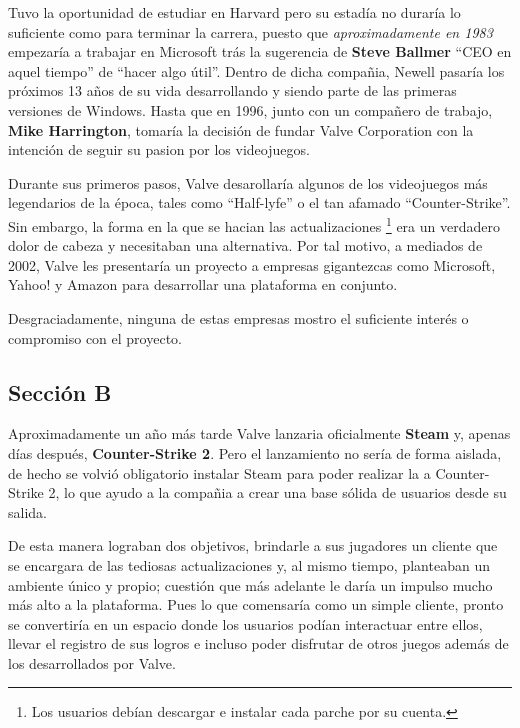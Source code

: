 \documentclass[letterpaper, 11pt]{article}
\begin{document}
    Tuvo la oportunidad de estudiar en Harvard pero su estadía no duraría lo suficiente como para terminar la carrera, puesto que \textit{aproximadamente en 1983} empezaría a trabajar en Microsoft trás la sugerencia de \textbf{Steve Ballmer} \enquote{CEO en aquel tiempo} de \enquote{hacer algo útil}. Dentro de dicha compañia, Newell pasaría los próximos 13 años de su vida desarrollando y siendo parte de las primeras versiones de Windows. Hasta que en 1996, junto con un compañero de trabajo, \textbf{Mike Harrington}, tomaría la decisión de fundar Valve Corporation con la intención de seguir su pasion por los videojuegos. 

\vspace{0.5cm}

    Durante sus primeros pasos, Valve desarollaría algunos de los videojuegos más legendarios de la época, tales como \enquote{Half-lyfe} o el tan afamado \enquote{Counter-Strike}. Sin embargo, la forma en la que se hacian las actualizaciones \footnote{Los usuarios debían descargar e instalar cada parche por su cuenta.} era un verdadero dolor de cabeza y necesitaban una alternativa. Por tal motivo, a mediados de 2002, Valve les presentaría un proyecto a empresas gigantezcas como Microsoft, Yahoo! y Amazon para desarrollar una plataforma en conjunto.   

\vspace{0.5cm}

    Desgraciadamente, ninguna de estas empresas mostro el suficiente interés o compromiso con el proyecto. 


\newpage
    \subsection{Sección B} %
    Aproximadamente un año más tarde Valve lanzaria oficialmente \textbf{Steam} y, apenas días después, \textbf{Counter-Strike 2}. Pero el lanzamiento no sería de forma aislada, de hecho se volvió obligatorio instalar Steam para poder realizar la a Counter-Strike 2, lo que ayudo a la compañia a crear una base sólida de usuarios desde su salida. 

    De esta manera lograban dos objetivos, brindarle a sus jugadores un cliente que se encargara de las tediosas actualizaciones y, al mismo tiempo, planteaban un ambiente único y propio; cuestión que más adelante le daría un impulso mucho más alto a la plataforma. Pues lo que comensaría como un simple cliente, pronto se convertiría en un espacio donde los usuarios podían interactuar entre ellos, llevar el registro de sus logros e incluso poder disfrutar de otros juegos además de los desarrollados por Valve.
\end{document}
